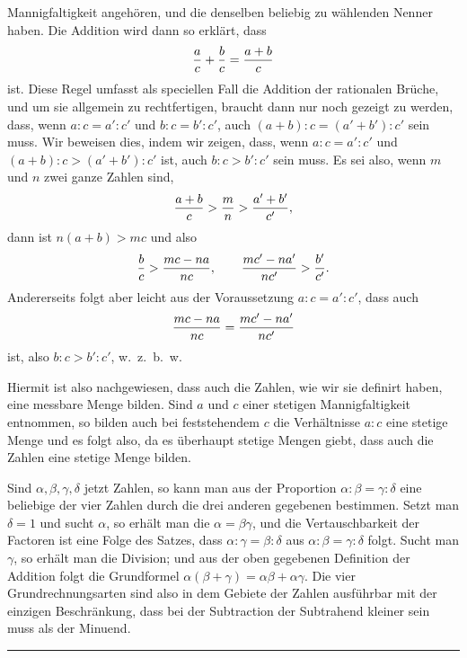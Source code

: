 Mannigfaltigkeit angehören, und die denselben beliebig zu wählenden
Nenner haben. Die Addition wird dann so erklärt, dass
\[
 {a\over c}+{b\over c}={a+b\over c}
\]
ist. Diese Regel umfasst als speciellen Fall die Addition der
rationalen Brüche, und um sie allgemein zu rechtfertigen, braucht dann
nur noch gezeigt zu werden, dass, wenn $a:c=a':c'$ und $b:c=b':c'$,
auch $(a+b):c=(a'+b'):c'$ sein muss. Wir beweisen dies, indem wir
zeigen, dass, wenn $a:c=a':c'$ und $(a+b):c>(a'+b'):c'$ ist, auch
$b:c>b':c'$ sein muss. Es sei also, wenn $m$ und $n$ zwei ganze Zahlen
sind,
\[
 {a+b\over c}>{m\over n}>{a'+b'\over c'},
\]
dann ist $n(a+b)>mc$ und also
\[
 {b\over c}>{mc-na\over nc},
 \qquad {mc'-na'\over nc'}>{b'\over c'}.
\]
Andererseits folgt aber leicht aus der Voraussetzung $a:c=a':c'$, dass
auch
\[
 {mc-na\over nc}={mc'-na'\over nc'}
\]
ist, also $b:c>b':c'$, w.~z.~b.~w.

Hiermit ist also nachgewiesen, dass auch die Zahlen, wie wir sie
definirt haben, eine messbare Menge bilden. Sind $a$ und $c$ einer
stetigen Mannigfaltigkeit entnommen, so bilden auch bei feststehendem
$c$ die Verhältnisse $a:c$ eine stetige Menge und es folgt also, da
es überhaupt stetige Mengen giebt, dass auch die Zahlen eine stetige
Menge bilden.

Sind $\alpha,\beta,\gamma,\delta$ jetzt Zahlen, so kann man aus der
Proportion $\alpha:\beta=\gamma:\delta$ eine beliebige der vier Zahlen
durch die drei anderen gegebenen bestimmen. Setzt man $\delta=1$ und
sucht $\alpha$, so erhält man die 
$\alpha=\beta\gamma$, und die Vertauschbarkeit der Factoren ist eine
Folge des Satzes, dass $\alpha:\gamma=\beta:\delta$ aus
$\alpha:\beta=\gamma:\delta$ folgt. Sucht man $\gamma$, so erhält man
die Division; und aus der oben gegebenen Definition der Addition folgt
die Grundformel $\alpha(\beta+\gamma)=\alpha\beta+\alpha\gamma$. Die vier
Grundrechnungsarten sind also in dem Gebiete der Zahlen ausführbar mit
der einzigen Beschränkung, dass bei der Subtraction der Subtrahend
kleiner sein muss als der Minuend.

\begin{center}
\rule{0.18\linewidth}{0.4pt}
\end{center}
